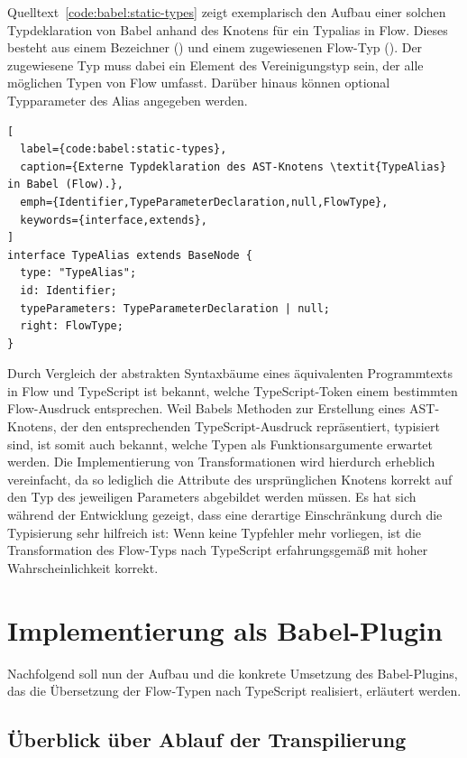 Quelltext~\ref{code:babel:static-types} zeigt exemplarisch den Aufbau einer solchen Typdeklaration von Babel anhand des Knotens für ein Typalias in Flow. Dieses besteht aus einem Bezeichner () und einem zugewiesenen Flow-Typ (). Der zugewiesene Typ muss dabei ein Element des Vereinigungstyp  sein, der alle möglichen Typen von Flow umfasst. Darüber hinaus können optional Typparameter des Alias angegeben werden.

\begin{lstlisting}[
  label={code:babel:static-types},
  caption={Externe Typdeklaration des AST-Knotens \textit{TypeAlias} in Babel (Flow).},
  emph={Identifier,TypeParameterDeclaration,null,FlowType},
  keywords={interface,extends},
]
interface TypeAlias extends BaseNode {
  type: "TypeAlias";
  id: Identifier;
  typeParameters: TypeParameterDeclaration | null;
  right: FlowType;
}
\end{lstlisting}

Durch Vergleich der abstrakten Syntaxbäume eines äquivalenten Programmtexts in Flow und TypeScript ist bekannt, welche TypeScript-Token einem bestimmten Flow-Ausdruck entsprechen. Weil Babels Methoden zur Erstellung eines AST-Knotens, der den entsprechenden TypeScript-Ausdruck repräsentiert, typisiert sind, ist somit auch bekannt, welche Typen als Funktionsargumente erwartet werden. Die Implementierung von Transformationen wird hierdurch erheblich vereinfacht, da so lediglich die Attribute des ursprünglichen Knotens korrekt auf den Typ des jeweiligen Parameters abgebildet werden müssen. Es hat sich während der Entwicklung gezeigt, dass eine derartige Einschränkung durch die Typisierung sehr hilfreich ist: Wenn keine Typfehler mehr vorliegen, ist die Transformation des Flow-Typs nach TypeScript erfahrungsgemäß mit hoher Wahrscheinlichkeit korrekt.

\section{Implementierung als Babel-Plugin}

Nachfolgend soll nun der Aufbau und die konkrete Umsetzung des Babel-Plugins, das die Übersetzung der Flow-Typen nach TypeScript realisiert, erläutert werden.

\subsection{Überblick über Ablauf der Transpilierung}

